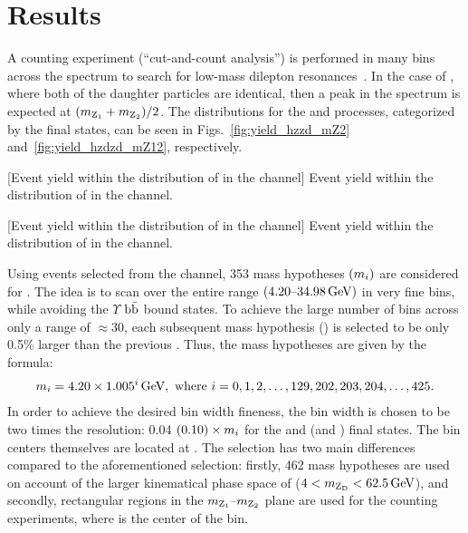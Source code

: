 \section{Results}
\label{sec:results_dilep}
A counting experiment (``cut-and-count analysis'') is performed in many bins across the \mZtwo spectrum to search for low-mass dilepton resonances~\cite{CMS:2021pcy}.
In the case of \htozdzd, where both of the daughter particles are identical, then a peak in the \mZtwo spectrum is expected at $(m_{\text{Z}_{\mathrm{1}}} + m_{\text{Z}_{\mathrm{2}}}) / 2$.
The \mZtwo distributions for the \htozzd and \htozdzd processes, categorized by the \mZtwo final states, can be seen in Figs.~\ref{fig:yield_hzzd_mZ2} and~\ref{fig:yield_hzdzd_mZ12}, respectively.
\begin{multiFigure}
    \centering
        [Event yield within the distribution of \mZtwo in the \htozzd channel]
        {Event yield within the distribution of \mZtwo in the \htozzd channel.}
    \label{fig:yield_hzzd_mZ2}
\end{multiFigure}
\begin{multiFigure}
    \centering
        [Event yield within the distribution of \mZtwo in the \htozdzd channel]
        {Event yield within the distribution of \mZtwo in the \htozdzd channel.}
    \label{fig:yield_hzdzd_mZ12}
\end{multiFigure}

Using events selected from the \htozzd channel, 353 mass hypotheses $\left( m_{i} \right)$ are considered for \mZtwo.
The idea is to scan over the entire \mZtwo range $(4.20\text{--}34.98 \,\text{Ge\hspace{-.08em}V})$ in very fine \mZtwo bins, while avoiding the $\varUpsilon$ $\mathrm{b} \bar{\mathrm{b}}$ bound states.  %
To achieve the large number of bins across only a range of $\approx$30\GeV, each subsequent mass hypothesis () is selected to be only 0.5\% larger than the previous .
Thus, the mass hypotheses are given by the formula:
\begin{align*}
    m_{i} = 4.20 \times 1.005^{i} \,\text{Ge\hspace{-.08em}V},
    \text{ where } i = 0,1,2, \ldots, 129, 202, 203, 204, \ldots, 425.
\end{align*}
In order to achieve the desired bin width fineness, the bin width is chosen to be two times the \mZtwo resolution:
0.04 $(0.10) \times m_{i}$ for the \fourmu and \twoetwomu (\foure and \twomutwoe) final states.
The bin centers themselves are located at .
The \zdzd selection has two main differences compared to the aforementioned \zzd selection:
firstly, 462 mass hypotheses are used on account of the larger kinematical phase space of \mZtwo ($4 < m_{\mathrm{Z}_\text{D}} < 62.5\,\text{Ge\hspace{-.08em}V}$),
and secondly, rectangular regions in the $m_{\text{Z}_{\mathrm{1}}} \text{--} m_{\text{Z}_{\mathrm{2}}}$ plane are used for the counting experiments, where  is the center of the bin.

